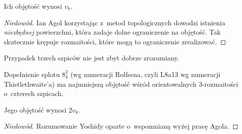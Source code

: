 
Ich objętość wynosi $v_8$.

\begin{proof}[Niedowód]
%
    Ian Agol \cite{agol2010} korzystając z~metod topologicznych dowodzi istnienia \emph{niezbędnej} powierzchni, która zadaje dolne ograniczenie na objętość.
    Tak skutecznie krępuje rozmaitości, które mogą to ograniczenie zrealizować.
\end{proof}

Przypadek trzech szpiców nie jest zbyt dobrze zrozumiany.
%

\begin{proposition}
    Dopełnienie splotu $8_4^2$ (wg numeracji Rolfsena, czyli L8a13 wg numeracji Thistlethwaite'a) ma najmniejszą objętość wśród orientowalnych 3-rozmaitości o~czterech szpicach.
%
\end{proposition}

Jego objętość wynosi $2v_8$.

\begin{proof}[Niedowód]
%
    Rozumowanie Yoshidy \cite{yoshida2013} oparte o~wspomnianą wyżej pracę Agola.
\end{proof}

%

